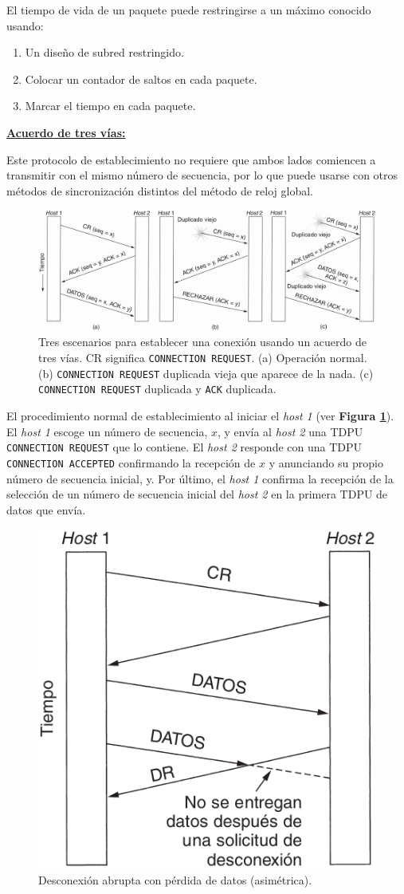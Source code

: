 \documentclass[10pt,a4paper]{article}
\begin{document}
El tiempo de vida de un paquete puede restringirse a un máximo conocido usando:
\begin{enumerate}
\item Un diseño de subred restringido.
\item Colocar un contador de saltos en cada paquete.
\item Marcar el tiempo en cada paquete.
\end{enumerate}

\underline{\textbf{Acuerdo de tres vías:}}

Este protocolo de establecimiento no requiere que ambos lados comiencen a transmitir con el mismo número de secuencia, por lo que puede usarse con otros métodos de sincronización distintos del método de reloj global.

\begin{figure}[ht!]
  \caption{Tres escenarios para establecer una conexión usando un acuerdo de tres vías. CR significa \texttt{CONNECTION REQUEST}. (a) Operación normal. (b) \texttt{CONNECTION REQUEST} duplicada vieja que aparece de la nada. (c) \texttt{CONNECTION REQUEST} duplicada y \texttt{ACK} duplicada.}
  \label{fig:acuerdo_tres_vias}
  \centerline{\includegraphics[width=\textwidth-\fboxrule-\fboxrule]{imgs/acuerdo_tres_vias.png}}
\end{figure}

El procedimiento normal de establecimiento al iniciar el \textit{host 1} (ver \textbf{Figura \ref{fig:acuerdo_tres_vias}}). El \textit{host 1} escoge un número de secuencia, $x$, y envía al \textit{host 2} una TDPU \texttt{CONNECTION REQUEST} que lo contiene. El \textit{host 2} responde con una TDPU \texttt{CONNECTION ACCEPTED} confirmando la recepción de $x$ y anunciando su propio número de secuencia inicial, y. Por último, el \textit{host 1} confirma la recepción de la selección de un número de secuencia inicial del \textit{host 2} en la primera TDPU de datos que envía.

\begin{figure}
  \caption{Desconexión abrupta con pérdida de datos (asimétrica).}
  \label{fig:liberacion_asimetrica}
  \centering
  \hbox{\includegraphics[width=0.35\textwidth-\fboxrule-\fboxrule]{imgs/liberacion_asimetrica.png}}
\end{figure}
\end{document}
